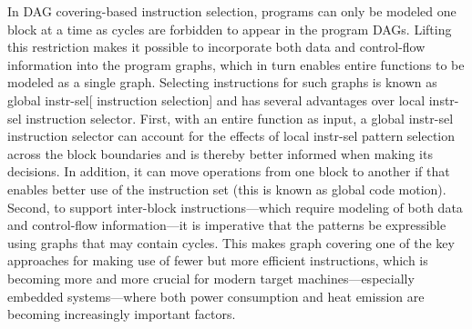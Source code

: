 %
%
%
In \gls{DAG covering}-based \gls{instruction selection}, \glspl{program} can
only be modeled one \gls{block} at a time as \glspl{cycle} are forbidden to
appear in the \glspl{program DAG}.
%
Lifting this restriction makes it possible to
incorporate both data and control-flow information into the \glspl{program
  graph}, which in turn enables entire \glspl{function} to be modeled as a
single \gls{graph}.
%
Selecting \glspl{instruction} for such \glspl{graph} is
known as \gls{global instr-sel}[ \gls{instruction selection}] and has several
advantages over \gls{local instr-sel} \gls{instruction selector}.
%
First, with an
entire \gls{function} as input, a \gls{global instr-sel} \gls{instruction
  selector} can account for the effects of \gls{local instr-sel} \gls{pattern
  selection} across the \gls{block} boundaries and is thereby better informed
when making its decisions.
%
In addition, it can move operations from one
\gls{block} to another if that enables better use of the \gls{instruction set}
(this is known as \gls{global code motion}).
%
Second, to support
\glspl{inter-block instruction}---which require modeling of both data and
control-flow information---it is imperative that the \glspl{pattern} be
expressible using \glspl{graph} that may contain \glspl{cycle}.
%
This makes
\gls{graph covering} one of the key approaches for making use of fewer but more
efficient \glspl{instruction}, which is becoming more and more crucial for
modern \glspl{target machine}---especially embedded systems---where both power
consumption and heat emission are becoming increasingly important factors.

